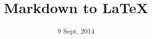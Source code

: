 \documentclass[12pt,a4paper]{report}
\begin{document}
  \title{Markdown to LaTeX}
  \date{9 Sept. 2014}
  
  \maketitle

  \renewcommand{\contentsname}{Sommaire}
  \tableofcontents
  
\end{document}
